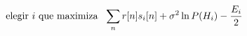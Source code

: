 \documentclass[preview]{standalone}
\begin{document}
\begin{align*}
\special{dvisvgm:raw <g id='unique000'>}\text{elegir }i\text{ que maximiza }\ \sum_n r[n]s_i[n]+\sigma^2\ln P(H_i)-\frac{E_i}{2}\special{dvisvgm:raw </g>}
\end{align*}
\end{document}

